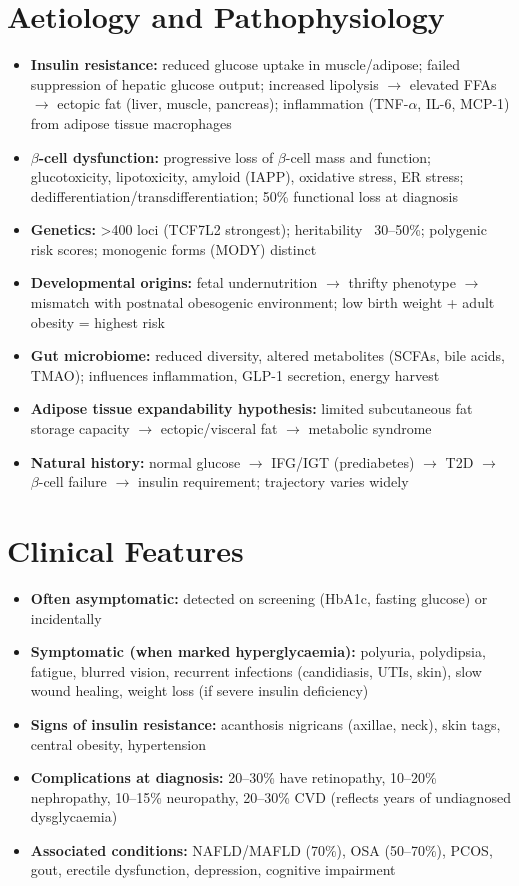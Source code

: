 \section*{Aetiology and Pathophysiology}
\begin{itemize}
    \item \textbf{Insulin resistance:} reduced glucose uptake in muscle/adipose; failed suppression of hepatic glucose output; increased lipolysis $\to$ elevated FFAs $\to$ ectopic fat (liver, muscle, pancreas); inflammation (TNF-$\alpha$, IL-6, MCP-1) from adipose tissue macrophages
    \item \textbf{$\beta$-cell dysfunction:} progressive loss of $\beta$-cell mass and function; glucotoxicity, lipotoxicity, amyloid (IAPP), oxidative stress, ER stress; dedifferentiation/transdifferentiation; 50\% functional loss at diagnosis
    \item \textbf{Genetics:} >400 loci (TCF7L2 strongest); heritability ~30--50\%; polygenic risk scores; monogenic forms (MODY) distinct
    \item \textbf{Developmental origins:} fetal undernutrition $\to$ thrifty phenotype $\to$ mismatch with postnatal obesogenic environment; low birth weight + adult obesity = highest risk
    \item \textbf{Gut microbiome:} reduced diversity, altered metabolites (SCFAs, bile acids, TMAO); influences inflammation, GLP-1 secretion, energy harvest
    \item \textbf{Adipose tissue expandability hypothesis:} limited subcutaneous fat storage capacity $\to$ ectopic/visceral fat $\to$ metabolic syndrome
    \item \textbf{Natural history:} normal glucose $\to$ IFG/IGT (prediabetes) $\to$ T2D $\to$ $\beta$-cell failure $\to$ insulin requirement; trajectory varies widely
\end{itemize}

\section*{Clinical Features}
\begin{itemize}
    \item \textbf{Often asymptomatic:} detected on screening (HbA1c, fasting glucose) or incidentally
    \item \textbf{Symptomatic (when marked hyperglycaemia):} polyuria, polydipsia, fatigue, blurred vision, recurrent infections (candidiasis, UTIs, skin), slow wound healing, weight loss (if severe insulin deficiency)
    \item \textbf{Signs of insulin resistance:} acanthosis nigricans (axillae, neck), skin tags, central obesity, hypertension
    \item \textbf{Complications at diagnosis:} 20--30\% have retinopathy, 10--20\% nephropathy, 10--15\% neuropathy, 20--30\% CVD (reflects years of undiagnosed dysglycaemia)
    \item \textbf{Associated conditions:} NAFLD/MAFLD (70\%), OSA (50--70\%), PCOS, gout, erectile dysfunction, depression, cognitive impairment
\end{itemize}

